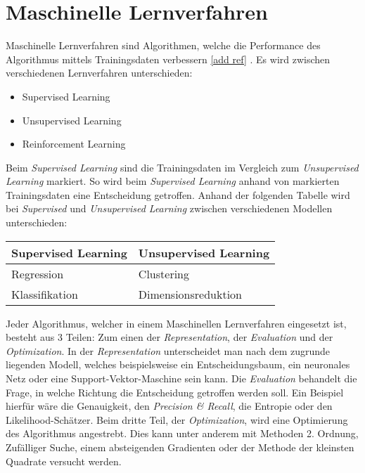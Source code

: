 \section{Maschinelle Lernverfahren}
Maschinelle Lernverfahren sind Algorithmen, welche die Performance des Algorithmus mittels Trainingsdaten verbessern \ref{add ref} . 
Es wird zwischen verschiedenen Lernverfahren unterschieden:
\begin{itemize}
    \item Supervised Learning
    \item Unsupervised Learning
    \item Reinforcement Learning
\end{itemize}
Beim \textit{Supervised Learning} sind die Trainingsdaten im Vergleich zum \textit{Unsupervised Learning} markiert. 
So wird beim \textit{Supervised Learning} anhand von markierten Trainingsdaten eine Entscheidung getroffen. 
Anhand der folgenden Tabelle wird bei \textit{Supervised} und \textit{Unsupervised Learning} zwischen verschiedenen Modellen unterschieden:
\begin{center}
    \begin{tabular}{ | l | l | }
      \hline
      \textbf{Supervised Learning} & \textbf{Unsupervised Learning} \\ \hline
      \hline
      Regression & Clustering \\ \hline
      Klassifikation & Dimensionsreduktion \\
      \hline
    \end{tabular}
\end{center}

Jeder Algorithmus, welcher in einem Maschinellen Lernverfahren eingesetzt ist, besteht aus 3 Teilen: Zum einen der \textit{Representation}, der \textit{Evaluation} und der \textit{Optimization}. 
In der \textit{Representation} unterscheidet man nach dem zugrunde liegenden Modell, welches beispielsweise ein Entscheidungsbaum, ein neuronales Netz oder eine Support-Vektor-Maschine sein kann.
Die \textit{Evaluation} behandelt die Frage, in welche Richtung die Entscheidung getroffen werden soll. 
Ein Beispiel hierfür wäre die Genauigkeit, den \textit{Precision & Recall}, die Entropie oder den Likelihood-Schätzer.
Beim dritte Teil, der \textit{Optimization}, wird eine Optimierung des Algorithmus angestrebt. 
Dies kann unter anderem mit Methoden 2. Ordnung, Zufälliger Suche, einem absteigenden Gradienten oder der Methode der kleinsten Quadrate versucht werden.

